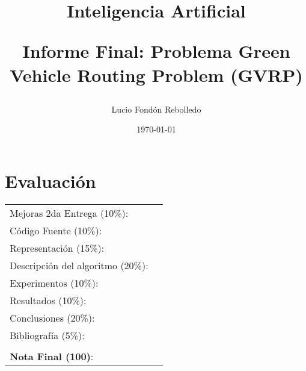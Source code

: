 \documentclass[letter, 10pt]{article}
\begin{document}
\title{Inteligencia Artificial \\ \begin{Large}Informe Final: Problema Green Vehicle Routing Problem (GVRP)\end{Large}}
\author{Lucio Fondón Rebolledo}
\date{\today}
\maketitle

\section*{Evaluaci\'on}

\begin{tabular}{ll}
Mejoras 2da Entrega (10\%): &  \underline{\hspace{2cm}}\\
C\'odigo Fuente (10\%): &  \underline{\hspace{2cm}}\\
Representaci\'on (15\%):  & \underline{\hspace{2cm}} \\
Descripci\'on del algoritmo (20\%):  & \underline{\hspace{2cm}} \\
Experimentos (10\%):  & \underline{\hspace{2cm}} \\
Resultados (10\%):  & \underline{\hspace{2cm}} \\
Conclusiones (20\%): &  \underline{\hspace{2cm}}\\
Bibliograf\'ia (5\%): & \underline{\hspace{2cm}}\\
 &  \\
\textbf{Nota Final (100)}:   & \underline{\hspace{2cm}}
\end{tabular}
\vspace{2cm}
\end{document}
